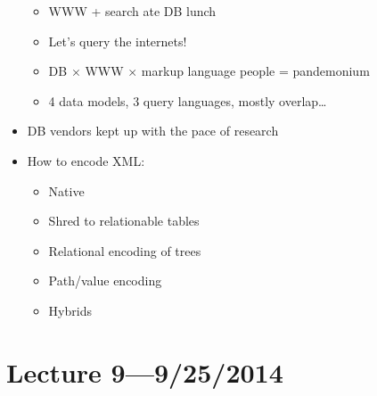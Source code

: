 \documentclass[10pt]{article}
\begin{document}
\begin{itemize}
\begin{itemize}
\item WWW + search ate DB lunch
\item Let's query the internets!
\item DB $\times$ WWW $\times$ markup language people = pandemonium
\item 4 data models, 3 query languages, mostly overlap\dots
\end{itemize}
\item DB vendors kept up with the pace of research
\item How to encode XML:
\begin{itemize}
\item Native
\item Shred to relationable tables
\item Relational encoding of trees
\item Path/value encoding
\item Hybrids
\end{itemize}
\end{itemize}

\section{Lecture 9---9/25/2014}
\end{document}
